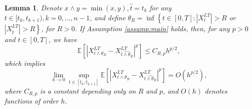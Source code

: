 \documentclass[10pt,a4paper]{amsart}
\newtheorem{lemma}{Lemma}
\begin{document}
\begin{lemma}\label{lemma:LT_onestep_stop}
     Denote $x\wedge y=\min(x,y),  \hat{t}=t_k$ for any $ t\in [t_k,t_{k+1}), k=0,\ldots, n-1$, and define $\theta_R=\inf \left\{t \in[0, T]:\left|X^{LT}_t\right|>R\right.$ or $\left.\left|X^{LT}_{\hat{t}}\right|>R\right\}$, for $R>0$. If Assumption \ref{assump:main} holds, then, for any $p>0$ and $t\in [0,T]$, we have
    \begin{equation}\label{eqn:LT onestep bound}
\mathbb{E}\left[\left|X^{LT}_{t \wedge \theta_R}-X^{LT}_{\widehat{t \wedge \theta_R}}\right|^p\right] \leq C_{R,p} h^{p / 2},
 \end{equation}
which  implies 
\begin{equation}\label{eqn:LT onestep convergence rate}
    \lim_{h\rightarrow 0}\sup _{t \in\left[t_{k}, t_{k+1}\right]} \mathbb{E}\left[\left|X^{LT}_{t \wedge \theta_R}-X^{LT}_{\widehat{t \wedge \theta_R}}\right|^p\right]=O\left(h^{p / 2}\right), 
\end{equation}
where $C_{R,p}$ is a constant depending only on $R$ and $p$, and $O(h)$ denotes functions of order $h$.
\end{lemma}
\end{document}
